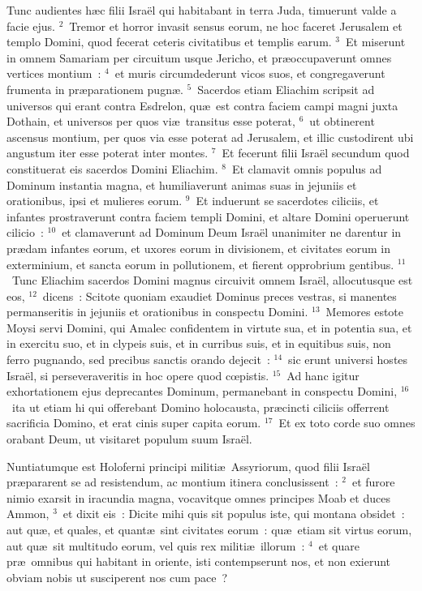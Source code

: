 \bchapter
\lettrine[lines=3,image=true,loversize=0.05,lraise=-0.03]{T}{}unc audientes h\ae c filii Isra\"el qui habitabant in terra Juda, timuerunt valde a facie ejus.
${}^{2}$~Tremor et horror invasit sensus eorum, ne hoc faceret Jerusalem et templo Domini, quod fecerat ceteris civitatibus et templis earum.
${}^{3}$~Et miserunt in omnem Samariam per circuitum usque Jericho, et pr\ae occupaverunt omnes vertices montium~:
${}^{4}$~et muris circumdederunt vicos suos, et congregaverunt frumenta in pr\ae parationem pugn\ae .
${}^{5}$~Sacerdos etiam Eliachim scripsit ad universos qui erant contra Esdrelon, qu\ae\ est contra faciem campi magni juxta Dothain, et universos per quos vi\ae\ transitus esse poterat,
${}^{6}$~ut obtinerent ascensus montium, per quos via esse poterat ad Jerusalem, et illic custodirent ubi angustum iter esse poterat inter montes.
${}^{7}$~Et fecerunt filii Isra\"el secundum quod constituerat eis sacerdos Domini Eliachim.
${}^{8}$~Et clamavit omnis populus ad Dominum instantia magna, et humiliaverunt animas suas in jejuniis et orationibus, ipsi et mulieres eorum.
${}^{9}$~Et induerunt se sacerdotes ciliciis, et infantes prostraverunt contra faciem templi Domini, et altare Domini operuerunt cilicio~:
${}^{10}$~et clamaverunt ad Dominum Deum Isra\"el unanimiter ne darentur in pr\ae dam infantes eorum, et uxores eorum in divisionem, et civitates eorum in exterminium, et sancta eorum in pollutionem, et fierent opprobrium gentibus.
${}^{11}$~Tunc Eliachim sacerdos Domini magnus circuivit omnem Isra\"el, allocutusque est eos,
${}^{12}$~dicens~: Scitote quoniam exaudiet Dominus preces vestras, si manentes permanseritis in jejuniis et orationibus in conspectu Domini.
${}^{13}$~Memores estote Moysi servi Domini, qui Amalec confidentem in virtute sua, et in potentia sua, et in exercitu suo, et in clypeis suis, et in curribus suis, et in equitibus suis, non ferro pugnando, sed precibus sanctis orando dejecit~:
${}^{14}$~sic erunt universi hostes Isra\"el, si perseveraveritis in hoc opere quod cœpistis.
${}^{15}$~Ad hanc igitur exhortationem ejus deprecantes Dominum, permanebant in conspectu Domini,
${}^{16}$~ita ut etiam hi qui offerebant Domino holocausta, pr\ae cincti ciliciis offerrent sacrificia Domino, et erat cinis super capita eorum.
${}^{17}$~Et ex toto corde suo omnes orabant Deum, ut visitaret populum suum Isra\"el.

\bchapter
\lettrine[lines=3,image=true,loversize=0.05,lraise=-0.03]{N}{}untiatumque est Holoferni principi militi\ae\ Assyriorum, quod filii Isra\"el pr\ae pararent se ad resistendum, ac montium itinera conclusissent~:
${}^{2}$~et furore nimio exarsit in iracundia magna, vocavitque omnes principes Moab et duces Ammon,
${}^{3}$~et dixit eis~: Dicite mihi quis sit populus iste, qui montana obsidet~: aut qu\ae , et quales, et quant\ae\ sint civitates eorum~: qu\ae\ etiam sit virtus eorum, aut qu\ae\ sit multitudo eorum, vel quis rex militi\ae\ illorum~:
${}^{4}$~et quare pr\ae\ omnibus qui habitant in oriente, isti contempserunt nos, et non exierunt obviam nobis ut susciperent nos cum pace~?


